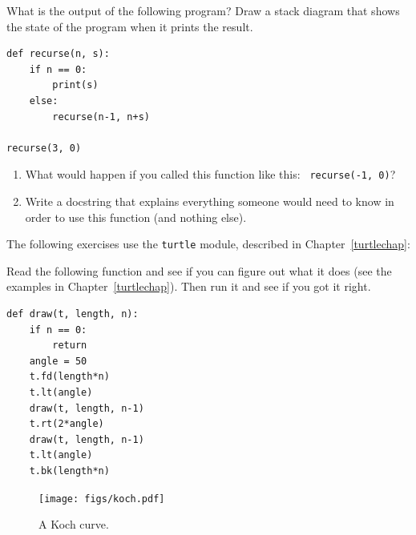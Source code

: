 \documentclass[10pt]{book}
\begin{document}
\begin{exercise}
What is the output of the following program?
Draw a stack diagram that shows the state of the program
when it prints the result.

\begin{verbatim}
def recurse(n, s):
    if n == 0:
        print(s)
    else:
        recurse(n-1, n+s)

recurse(3, 0)
\end{verbatim}

\begin{enumerate}

\item What would happen if you called this function like this: {\tt
  recurse(-1, 0)}?

\item Write a docstring that explains everything someone would need to
  know in order to use this function (and nothing else).

\end{enumerate}

\end{exercise}


The following exercises use the {\tt turtle} module, described in
Chapter~\ref{turtlechap}:

\begin{exercise}

Read the following function and see if you can figure out
what it does (see the examples in Chapter~\ref{turtlechap}).  Then run it
and see if you got it right.

\begin{verbatim}
def draw(t, length, n):
    if n == 0:
        return
    angle = 50
    t.fd(length*n)
    t.lt(angle)
    draw(t, length, n-1)
    t.rt(2*angle)
    draw(t, length, n-1)
    t.lt(angle)
    t.bk(length*n)
\end{verbatim}

\end{exercise}


\begin{figure}
\centerline
{\texttt{[image: figs/koch.pdf]}}
\caption{A Koch curve.}
\label{fig.koch}
\end{figure}
\end{document}
